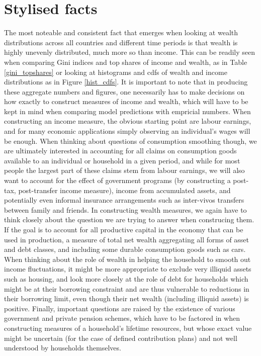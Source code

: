 \section{Stylised facts}
The most noteable and consistent fact that emerges when looking at wealth
distributions across all countries and different time periods is that wealth
is highly unevenly distributed, much more so than income. This can be readily
seen when comparing Gini indices and top shares of income and wealth, as in
Table \ref{gini_topshares} or looking at histograms and cdfs of wealth and
income distributions as in Figure \ref{hist_cdfs}. It is important to note
that in producing these aggregate numbers and figures, one necessarily has
to make decisions on how exactly to construct measures of income and wealth,
which will have to be kept in mind when comparing model predictions with
empricial numbers. When constructing an income measure, the obvious starting
point are labour earnings, and for many economic applications simply
observing an individual's wages will be enough. When thinking about questions
of consumption smoothing though, we are ultimately interested in accounting
for all claims on consumption goods available to an individual or household
in a given period, and while for most people the largest part of these claims
stem from labour earnings, we will also want to account for the effect of
government programs (by constructing a post-tax, post-transfer income measure),
income from accumulated assets, and potentially even informal insurance
arrangements such as inter-vivos transfers between family and friends.
In constructing wealth measures, we again have to think closely about the
question we are trying to answer when construcing them. If the goal is to
account for all productive capital in the economy that can be used in
production, a measure of total net wealth aggregating all forms of asset and
debt classes, and including some durable consumption goods such as cars. When
thinking about the role of wealth in helping the household to smooth out
income fluctuations, it might be more appropriate to exclude very illiquid
assets such as housing, and look more closely at the role of debt for households
which might be at their borrowing constraint and are thus vulnerable to
reductions in their borrowing limit, even though their net wealth (including
illiquid assets) is positive. Finally, important questions are raised by
the existence of various government and private pension schemes, which have
to be factored in when constructing measures of a household's lifetime
resources, but whose exact value might be uncertain (for the case of defined
contribution plans) and not well understood by households themselves.


